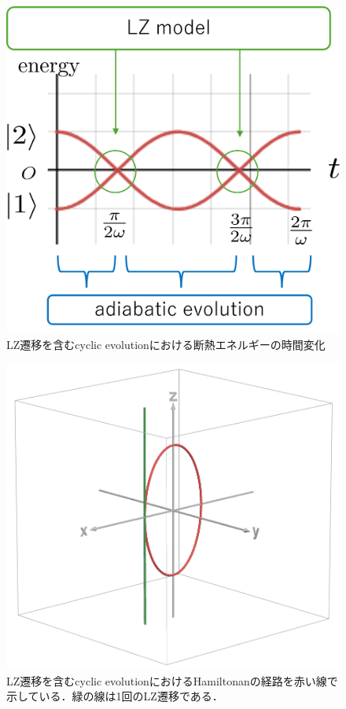 \begin{figure}[htbp]
  \centering
  \includegraphics[scale=0.7]{figures/CE_LZ.png}
  \caption{LZ遷移を含むcyclic evolutionにおける断熱エネルギーの時間変化}
  \label{fig:CE_LZ}
\end{figure}

\begin{figure}[htbp]
  \centering
  \includegraphics[scale=0.3]{figures/CE_LZ_Pauli.png}
  \caption{LZ遷移を含むcyclic evolutionにおけるHamiltonanの経路を赤い線で示している．緑の線は1回のLZ遷移である．}
  \label{fig:CE_LZ_Pauli}
\end{figure}



